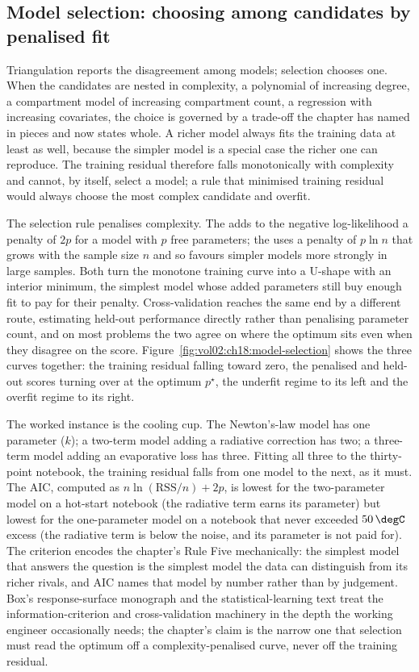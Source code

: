 \subsection{Model selection: choosing among candidates by penalised fit}

Triangulation reports the disagreement among models; selection chooses
one. When the candidates are nested in complexity, a polynomial of
increasing degree, a compartment model of increasing compartment count, a
regression with increasing covariates, the choice is governed by a
trade-off the chapter has named in pieces and now states whole. A richer
model always fits the training data at least as well, because the simpler
model is a special case the richer one can reproduce. The training
residual therefore falls monotonically with complexity and cannot, by
itself, select a model; a rule that minimised training residual would
always choose the most complex candidate and overfit.

The selection rule penalises complexity. The  adds to the negative log-likelihood a penalty of $2p$ for a
model with $p$ free parameters; the  uses a penalty of $p \ln n$ that grows with the sample size
$n$ and so favours simpler models more strongly in large samples. Both
turn the monotone training curve into a U-shape with an interior minimum,
the simplest model whose added parameters still buy enough fit to pay for
their penalty. Cross-validation reaches the same end by a different route,
estimating held-out performance directly rather than penalising parameter
count, and on most problems the two agree on where the optimum sits even
when they disagree on the score.
Figure~\ref{fig:vol02:ch18:model-selection} shows the three curves
together: the training residual falling toward zero, the penalised and
held-out scores turning over at the optimum $p^\star$, the underfit regime
to its left and the overfit regime to its right.

The worked instance is the cooling cup. The Newton's-law model has one
parameter ($k$); a two-term model adding a radiative correction has two; a
three-term model adding an evaporative loss has three. Fitting all three
to the thirty-point notebook, the training residual falls from one model
to the next, as it must. The AIC, computed as $n \ln(\text{RSS}/n) + 2p$,
is lowest for the two-parameter model on a hot-start notebook (the
radiative term earns its parameter) but lowest for the one-parameter model
on a notebook that never exceeded $50\,\degC$ excess (the radiative term
is below the noise, and its parameter is not paid for). The criterion
encodes the chapter's Rule Five mechanically: the simplest model that
answers the question is the simplest model the data can distinguish from
its richer rivals, and AIC names that model by number rather than by
judgement. Box's response-surface monograph
\cite{text:v2ch18-box-empirical-1987} and the statistical-learning text
\cite{text:v2ch18-hastie-statistical-learning-2009} treat the
information-criterion and cross-validation machinery in the depth the
working engineer occasionally needs; the chapter's claim is the narrow
one that selection must read the optimum off a complexity-penalised curve,
never off the training residual.

